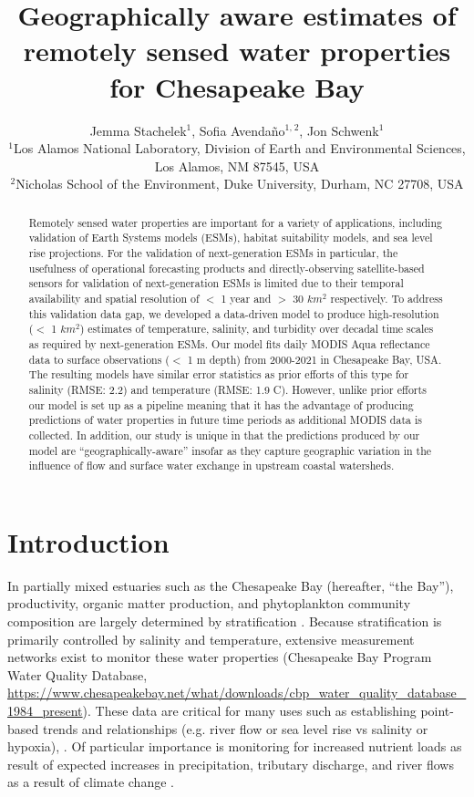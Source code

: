 \documentclass{article}
\title{Geographically aware estimates of remotely sensed water properties for Chesapeake Bay}
\author{Jemma Stachelek$^{1}$, Sofia Avendaño$^{1,}$$^{2}$, Jon Schwenk$^{1}$  \\
        \small $^{1}$Los Alamos National Laboratory, Division of Earth and Environmental Sciences, Los Alamos, NM 87545, USA \\
        \small $^{2}$Nicholas School of the Environment, Duke University, Durham, NC 27708, USA \\
}
\date{}
\begin{document}
\maketitle

\begin{abstract}
    \noindent Remotely sensed water properties are important for a variety of applications, including validation of Earth Systems models (ESMs), habitat suitability models, and sea level rise projections. For the validation of next-generation ESMs in particular, the usefulness of operational forecasting products and directly-observing satellite-based sensors for validation of next-generation ESMs is limited due to their temporal availability and spatial resolution of $<$ 1 year and $>$ 30 $km^2$ respectively. To address this validation data gap, we developed a data-driven model to produce high-resolution ($<$ 1 $km^2$) estimates of temperature, salinity, and turbidity over decadal time scales as required by next-generation ESMs. Our model fits daily MODIS Aqua reflectance data to surface observations ($<$ 1 m depth) from 2000-2021 in Chesapeake Bay, USA. The resulting models have similar error statistics as prior efforts of this type for salinity (RMSE: 2.2) and temperature (RMSE: 1.9 C). However, unlike prior efforts our model is set up as a pipeline meaning that it has the advantage of producing predictions of water properties in future time periods as additional MODIS data is collected. In addition, our study is unique in that the predictions produced by our model are “geographically-aware” insofar as they capture geographic variation in the influence of flow and surface water exchange in upstream coastal watersheds.
    \end{abstract} \hspace{10pt}

\linenumbers

\section{Introduction}

In partially mixed estuaries such as the Chesapeake Bay (hereafter, “the Bay”), productivity, organic matter production, and phytoplankton community composition are largely determined by stratification \citep{xuClimateForcingSalinity2012}. Because stratification is primarily controlled by salinity and temperature, extensive measurement networks exist to monitor these water properties (Chesapeake Bay Program Water Quality Database, \url{https://www.chesapeakebay.net/what/downloads/cbp_water_quality_database_1984_present}). These data are critical for many uses such as establishing point-based trends and relationships (e.g. river flow or sea level rise vs salinity or hypoxia), \citet{hagyHypoxiaChesapeakeBay2004}. Of particular importance is monitoring for increased nutrient loads as result of expected increases in precipitation, tributary discharge, and river flows as a result of climate change \citep{najjarPotentialClimatechangeImpacts2010, irbyCompetingImpactsClimate2018}.
\end{document}
